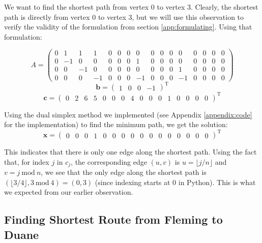 We want to find the shortest path from vertex 0 to vertex 3. Clearly, the shortest path is directly from vertex 0 to vertex 3, but we will use this observation to verify the validity of the formulation from section \ref{app:formulating}. Using that formulation:

\begin{equation*}
    A = 
    \begin{pmatrix}
        0 & 1 & 1 & 1 & 0 & 0 & 0 & 0 & 0 & 0 & 0 & 0 & 0 & 0 & 0 & 0\\
        0 & -1 & 0 & 0 & 0 & 0 & 0 & 1 & 0 & 0 & 0 & 0 & 0 & 0 & 0 & 0\\
        0 & 0 & -1 & 0 & 0 & 0 & 0 & 0 & 0 & 0 & 0 & 1 & 0 & 0 & 0 & 0\\
        0 & 0 & 0 & -1 & 0 & 0 & 0 & -1 & 0 & 0 & 0 & -1 & 0 & 0 & 0 & 0
    \end{pmatrix}
\end{equation*}
\begin{equation*}
    \mathbf{b} = 
    \begin{pmatrix}
        1 & 0 & 0 & -1
    \end{pmatrix}^\text{T}
\end{equation*}
\begin{equation*}
    \mathbf{c} = 
    \begin{pmatrix}
        0 & 2 & 6 & 5 & 0 & 0 & 0 & 4 & 0 & 0 & 0 & 1 & 0 & 0 & 0 & 0
    \end{pmatrix}^\text{T}
\end{equation*}

Using the dual simplex method we implemented (see Appendix \ref{appendix:code} for the implementation) to find the minimum path, we get the solution:
\begin{equation*}
    \mathbf{x} = 
    \begin{pmatrix}
        0 & 0 & 0 & 1 & 0 & 0 & 0 & 0 & 0 & 0 & 0 & 0 & 0 & 0 & 0 & 0
    \end{pmatrix}^\text{T}
\end{equation*}

This indicates that there is only one edge along the shortest path. Using the fact that, for index $j$ in $c_j$, the corresponding edge $(u,v)$ is $u = \lfloor j / n \rfloor$ and $v = j\ \text{mod}\ n$, we see that the only edge along the shortest path is $(\lfloor 3 / 4 \rfloor, 3\ \text{mod}\ 4) = (0,3)$ (since indexing starts at 0 in Python). This is what we expected from our earlier observation.

\subsection{Finding Shortest Route from Fleming to Duane}

